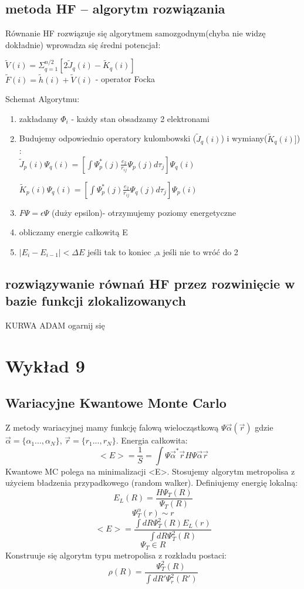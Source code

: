 \documentclass{article}
\begin{document}
					\subsection{metoda HF –	algorytm rozwiązania}
					Równanie HF rozwiązuje się algorytmem samozgodnym(chyba nie widzę dokładnie)  wprowadza się średni potencjał:
					\begin{center}
						$\tilde{V}(i)= \Sigma_{q=1}^{n/2} [2 \tilde{J}_{q}(i)-\tilde{K}_{q}(i)]$\\
						$\tilde{F}(i)=\tilde{h}(i)+\tilde{V}(i)$ - operator Focka
					\end{center}
					Schemat Algorytmu:
					\begin{enumerate}
						\item zakładamy $\Phi_{i}$ - każdy stan obsadzamy 2 elektronami
						\item Budujemy odpowiednio operatory kulombowski ($\tilde{J}_{q}(i)$) i wymiany($\tilde{K}_{q}(i)]$) :\\
						$\tilde{J}_{p}(i) \Psi_{q}(i)=[\int \Psi_{p}^{*}(j)\frac{e_{2}}{r_{ij}}\Psi_{p}(j)d\tau_{j}]\Psi_{q}(i)$
						
						$\tilde{K}_{p}(i) \Psi_{q}(i)=[\int \Psi_{p}^{*}(j)\frac{e_{2}}{r_{ij}}\Psi_{q}(j)d\tau_{j}]\Psi_{p}(i)$
						\item $F\Psi=\epsilon \Psi $ (duży epsilon)- otrzymujemy poziomy energetyczne 
						\item obliczamy energie całkowitą E
						\item $|E_{i}-E_{i-1}|<\Delta E$ jeśli tak to koniec ,a jeśli nie to  wróć do 2
					\end{enumerate}
					
					\subsection{rozwiązywanie równań HF przez rozwinięcie w bazie funkcji zlokalizowanych}
					
					KURWA ADAM ogarnij się
			\section{Wykład 9}
			\subsection{Wariacyjne Kwantowe Monte Carlo}
			Z metody wariacyjnej mamy funkcję falową wielocząstkową $\Psi\vec{\alpha}(\vec{r})$ gdzie $\vec{\alpha} = \{\alpha_1... ,\alpha_N\}$, $\vec{r} = \{r_1... ,r_N\}$. Energia całkowita: 
			$$<E> = \frac{1}{S} = \int\Psi\vec{\alpha}^*\vec{r}H\Psi\vec{\alpha}\vec{r}$$
			Kwantowe MC polega na minimalizacji <E>. Stosujemy algorytm metropolisa z użyciem bładzenia przypadkowego (random walker). Definiujemy energię lokalną:
			$$E_L(R) = \frac{H\Psi_T(R)}{\Psi_T(R)}$$
			$$\Psi_T^\alpha(r) \sim r$$
			$$<E> = \frac{\int dR \Psi^2_T(R)E_L(r)}{\int dR \Psi^2_T(R)}$$
			$$\Psi_T \in R$$
	        Konstruuje się algorytm typu metropolisa z rozkładu postaci:
	        $$\rho(R) = \frac{\Psi_T^2(R)}{\int dR'\Psi_r^2(R')}$$
\end{document}
